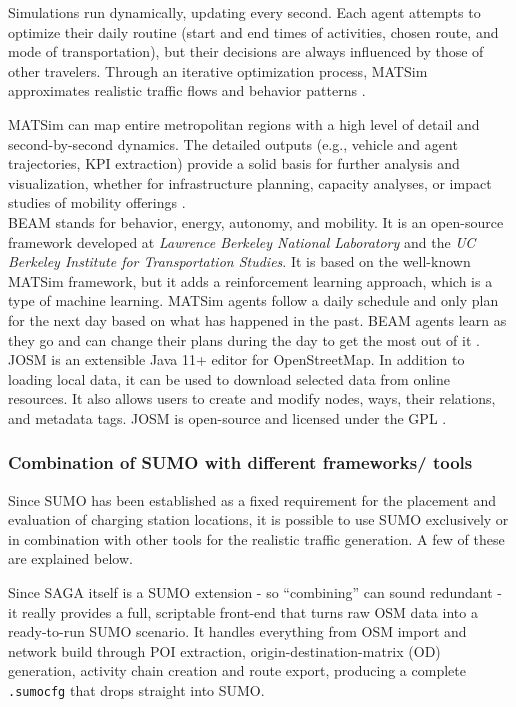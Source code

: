 Simulations run dynamically, updating every second. Each agent attempts to optimize their daily routine (start and end times of activities, chosen route, and mode of transportation), but their decisions are always influenced by those of other travelers. Through an iterative optimization process, MATSim approximates realistic traffic flows and behavior patterns \cite{community_matsim_2025}.

MATSim can map entire metropolitan regions with a high level of detail and second-by-second dynamics. The detailed outputs (e.g., vehicle and agent trajectories, KPI extraction) provide a solid basis for further analysis and visualization, whether for infrastructure planning, capacity analyses, or impact studies of mobility offerings \cite{community_matsim_2025}.\\

BEAM stands for behavior, energy, autonomy, and mobility. It is an open-source framework developed at \textit{Lawrence Berkeley National Laboratory} and the \textit{UC Berkeley Institute for Transportation Studies}. It is based on the well-known MATSim framework, but it adds a reinforcement learning approach, which is a type of machine learning. MATSim agents follow a daily schedule and only plan for the next day based on what has happened in the past. BEAM agents learn as they go and can change their plans during the day to get the most out of it \cite{noauthor_beamdocsaboutrst_nodate}.\\

JOSM is an extensible Java 11+ editor for OpenStreetMap. In addition to loading local data, it can be used to download selected data from online resources. It also allows users to create and modify nodes, ways, their relations, and metadata tags. JOSM is open-source and licensed under the GPL \cite{noauthor_josm_nodate}.

\subsubsection{Combination of SUMO with different frameworks/ tools}
Since SUMO has been established as a fixed requirement for the placement and evaluation of charging station locations, it is possible to use SUMO exclusively or in combination with other tools for the realistic traffic generation. A few of these are explained below.

Since SAGA itself is a SUMO extension - so “combining” can sound redundant - it really provides a full, scriptable front-end that turns raw OSM data into a ready-to-run SUMO scenario. It handles everything from OSM import and network build through POI extraction, origin-destination-matrix (OD) generation, activity chain creation and route export, producing a complete \texttt{.sumocfg} that drops straight into SUMO.

